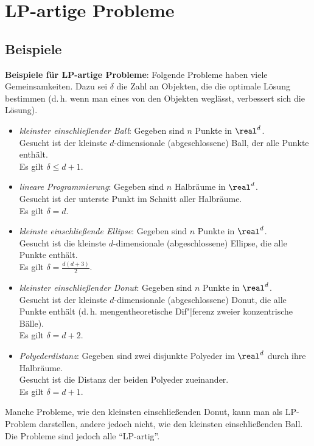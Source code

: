 \pagebreak

\section{%
    LP-artige Probleme%
}

\subsection{%
    Beispiele%
}

\textbf{Beispiele für LP-artige Probleme}:
Folgende Probleme haben viele Gemeinsamkeiten.
Dazu sei $\delta$ die Zahl an Objekten, die die optimale Lösung bestimmen
(d.\,h. wenn man eines von den Objekten weglässt, verbessert sich die Lösung).
\begin{itemize}
    \item
    \emph{kleinster einschließender Ball}:
    Gegeben sind $n$ Punkte in $\real^d$.\\
    Gesucht ist der kleinste $d$-dimensionale (abgeschlossene) Ball, der alle Punkte enthält.\\
    Es gilt $\delta \le d + 1$.

    \item
    \emph{lineare Programmierung}:
    Gegeben sind $n$ Halbräume in $\real^d$.\\
    Gesucht ist der unterste Punkt im Schnitt aller Halbräume.\\
    Es gilt $\delta = d$.

    \item
    \emph{kleinste einschließende Ellipse}:
    Gegeben sind $n$ Punkte in $\real^d$.\\
    Gesucht ist die kleinste $d$-dimensionale (abgeschlossene) Ellipse, die alle Punkte enthält.\\
    Es gilt $\delta = \frac{d(d+3)}{2}$.

    \item
    \emph{kleinster einschließender Donut}:
    Gegeben sind $n$ Punkte in $\real^d$.\\
    Gesucht ist der kleinste $d$-dimensionale (abgeschlossene) Donut, die alle Punkte enthält
    (d.\,h. mengentheoretische Dif"|ferenz zweier konzentrische Bälle).\\
    Es gilt $\delta = d + 2$.

    \item
    \emph{Polyederdistanz}:
    Gegeben sind zwei disjunkte Polyeder im $\real^d$ durch ihre Halbräume.\\
    Gesucht ist die Distanz der beiden Polyeder zueinander.\\
    Es gilt $\delta = d + 1$.
\end{itemize}
Manche Probleme, wie den kleinsten einschließenden Donut, kann man als LP-Problem darstellen,
andere jedoch nicht, wie den kleinsten einschließenden Ball.
Die Probleme sind jedoch alle "`LP-artig"'.

